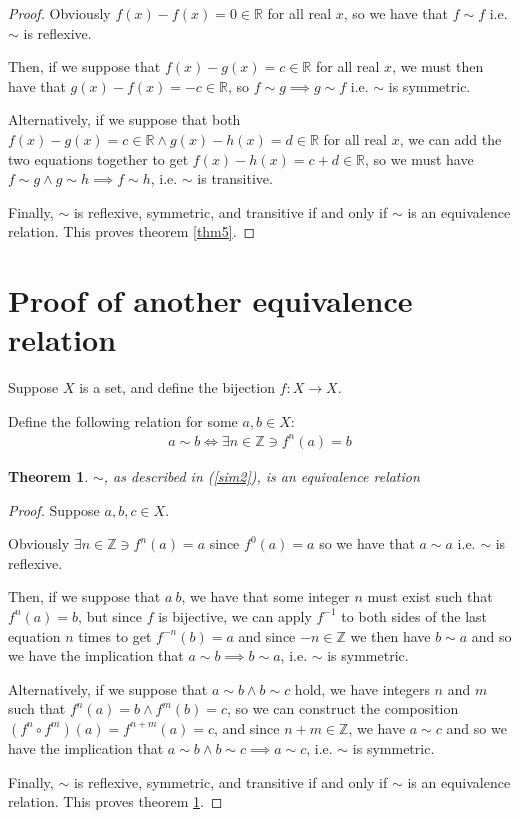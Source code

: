 \documentclass[12pt]{article}
\newcommand{\reals}{\mathbb{R}}
\newcommand{\ints}{\mathbb{Z}}
\newtheorem{thm}{Theorem}
\begin{document}
\begin{proof}
	Obviously $f(x) - f(x) = 0 \in \reals$
	for all real $x$,
	so we have that $f \sim f$
	i.e. $\sim$ is reflexive.

	Then, if we suppose that $f(x) - g(x) = c \in \reals$
	for all real $x$,
	we must then have
	that $g(x) - f(x) = -c \in \reals$,
	so $f \sim g \implies g \sim f$
	i.e. $\sim$ is symmetric.

	Alternatively, if we suppose that both
	$f(x) - g(x) = c \in \reals \land g(x) - h(x) = d \in \reals$
	for all real $x$,
	we can add the two equations together to get
	$f(x) - h(x) = c + d \in \reals$,
	so we must have $f \sim g \land g \sim h \implies f \sim h$,
	i.e. $\sim$ is transitive.

	Finally, $\sim$ is
	reflexive,
	symmetric,
	and transitive
	if and only if
	$\sim$ is an equivalence relation.
	This proves theorem \ref{thm5}.
\end{proof}

\section{Proof of another equivalence relation}

Suppose $X$ is a set,
and define the bijection $f:X \to X$.

Define the following relation for some $a,b \in X$:
\begin{align} \label{sim2}
	a \sim b \iff \exists n \in \ints \ni f^n(a) = b
\end{align}

\begin{thm} \label{thm6}
	$\sim$, as described in (\ref{sim2}), is an equivalence relation
\end{thm}

\begin{proof}
	Suppose $a,b,c \in X$.

	Obviously $\exists n \in \ints \ni f^n(a) = a$
	since $f^0(a) = a$
	so we have that $a \sim a$
	i.e. $\sim$ is reflexive.

	Then, if we suppose that $a ~ b$,
	we have that some integer $n$ must
	exist such that $f^n(a) = b$,
	but since $f$ is bijective, we can apply $f^{-1}$
	to both sides of the last equation $n$ times
	to get $f^{-n}(b) = a$ and since $-n \in \ints$
	we then have $b \sim a$ and so
	we have the implication that
	$a \sim b \implies b \sim a$,
	i.e. $\sim$ is symmetric.

	Alternatively, if we suppose that
	$a \sim b \land b \sim c$ hold,
	we have integers $n$ and $m$ such that
	$f^n(a) = b \land f^m(b) = c$,
	so we can construct the composition
	$(f^n \circ f^m)(a) = f^{n + m}(a) = c$,
	and since $n + m \in \ints$,
	we have $a \sim c$ and so
	we have the implication that
	$a \sim b \land b \sim c \implies a \sim c$,
	i.e. $\sim$ is symmetric.

	Finally, $\sim$ is
	reflexive,
	symmetric,
	and transitive
	if and only if
	$\sim$ is an equivalence relation.
	This proves theorem \ref{thm6}.
\end{proof}
\end{document}
